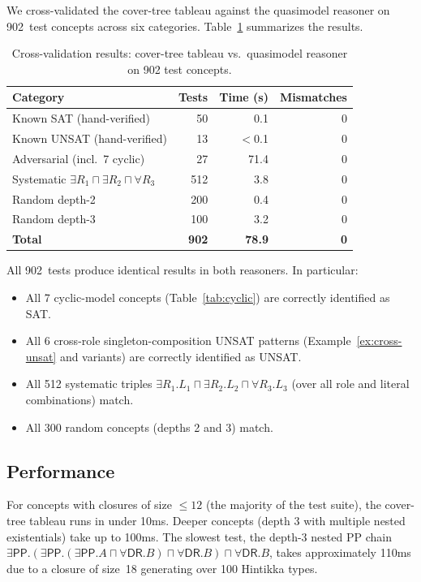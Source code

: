 \documentclass[a4paper,11pt]{article}
\theoremstyle{definition}
\newcommand{\DR}{\ensuremath{\mathsf{DR}}}
\newcommand{\PP}{\ensuremath{\mathsf{PP}}}
\begin{document}
We cross-validated the cover-tree tableau against the quasimodel
reasoner on 902~test concepts across six categories.
Table~\ref{tab:results} summarizes the results.

\begin{table}[ht]
\centering
\caption{Cross-validation results: cover-tree tableau vs.\
  quasimodel reasoner on 902 test concepts.}
\label{tab:results}
\renewcommand{\arraystretch}{1.2}
\begin{tabular}{lrrr}
\toprule
Category & Tests & Time (s) & Mismatches \\
\midrule
Known SAT (hand-verified) & 50 & 0.1 & 0 \\
Known UNSAT (hand-verified) & 13 & $<$0.1 & 0 \\
Adversarial (incl.\ 7 cyclic) & 27 & 71.4 & 0 \\
Systematic $\exists R_1 \sqcap \exists R_2 \sqcap \forall R_3$
  & 512 & 3.8 & 0 \\
Random depth-2 & 200 & 0.4 & 0 \\
Random depth-3 & 100 & 3.2 & 0 \\
\midrule
\textbf{Total} & \textbf{902} & \textbf{78.9} & \textbf{0} \\
\bottomrule
\end{tabular}
\end{table}

All 902~tests produce identical results in both reasoners.
In particular:
\begin{itemize}[nosep]
  \item All 7 cyclic-model concepts
    (Table~\ref{tab:cyclic}) are correctly identified as SAT.
  \item All 6 cross-role singleton-composition UNSAT patterns
    (Example~\ref{ex:cross-unsat} and variants) are correctly
    identified as UNSAT.
  \item All 512 systematic triples
    $\exists R_1.L_1 \sqcap \exists R_2.L_2 \sqcap \forall R_3.L_3$
    (over all role and literal combinations) match.
  \item All 300 random concepts (depths 2 and 3) match.
\end{itemize}

\subsection{Performance}

For concepts with closures of size $\leq 12$ (the majority of
the test suite), the cover-tree tableau runs in under 10ms.
Deeper concepts (depth 3 with multiple nested existentials) take
up to 100ms.  The slowest test, the depth-3 nested PP chain
$\exists\PP.(\exists\PP.(\exists\PP.A \sqcap \forall\DR.B)
\sqcap \forall\DR.B) \sqcap \forall\DR.B$,
takes approximately 110ms due to a closure of size~18 generating
over 100 Hintikka types.
\end{document}
